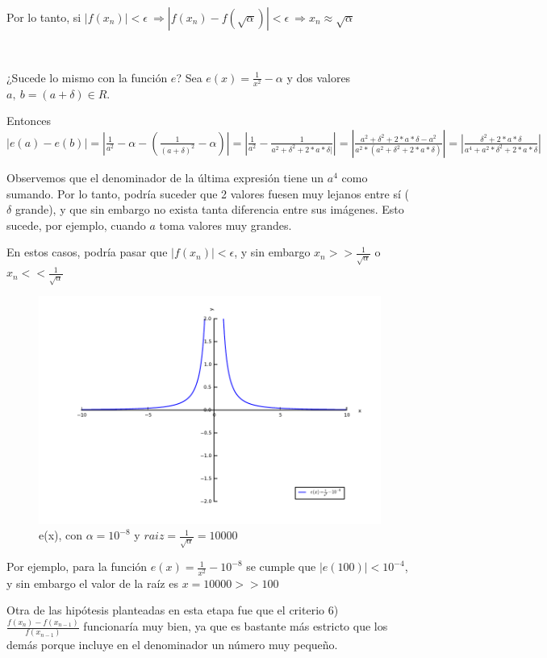 Por lo tanto, si $|f(x_{n})| < \epsilon \ \Rightarrow |f(x_{n}) - f(\sqrt{\alpha})| < \epsilon \ \Rightarrow x_{n} \approx \sqrt{\alpha}$

~

¿Sucede lo mismo con la función $e$? Sea $e(x) = \frac{1}{x^{2}} - \alpha$ y dos valores $a, \ b=(a+\delta) \in R$. 

Entonces $|e(a) - e(b)| = |\frac{1}{a^{2}} - \alpha - (\frac{1}{(a+\delta)^{2}} - \alpha) | =
|\frac{1}{a^{2}} - \frac{1}{a^{2}+\delta^{2}+2*a*\delta|} | = | \frac{a^{2}+\delta^{2}+2*a*\delta-a^{2}}{a^{2}*(a^{2}+\delta^{2}+2*a*\delta)} | = |\frac{\delta^{2}+2*a*\delta}{a^{4}+a^{2}*\delta^{2}+2*a*\delta}|$

Observemos que el denominador de la última expresión tiene un $a^{4}$ como sumando. Por lo tanto, podría suceder que 2 valores fuesen muy lejanos entre sí ($\delta$ grande), y que sin embargo no exista
tanta diferencia entre sus imágenes. Esto sucede, por ejemplo, cuando $a$ toma valores muy grandes.

En estos casos, podría pasar que $|f(x_{n})| < \epsilon$, y sin embargo $x_{n} >> \frac{1}{\sqrt{\alpha}}$ o $x_{n} << \frac{1}{\sqrt{\alpha}}$

\begin{figure}[!h]
	\begin{center}
		  \includegraphics[keepaspectratio]{../Imagenes/exp3/raiz_10000.pdf}
		  \caption{e(x), con $\alpha=10^{-8}$ y $raiz=\frac{1}{\sqrt{\alpha}}=10000$ }
		  \label{fig:contra1}
	\end{center}
\end{figure}
\FloatBarrier

Por ejemplo, para la función $e(x)=\frac{1}{x^2}-10^{-8}$ se cumple que $|e(100)| < 10^{-4}$, y sin embargo el valor de la raíz es $x=10000 >> 100$

Otra de las hipótesis planteadas en esta etapa fue que el criterio 6) $\frac{f(x_{n})-f(x_{n-1})}{f(x_{n-1})}$ funcionaría muy bien, ya que es bastante más estricto que los demás porque incluye en el denominador
un número muy peque\~no.


